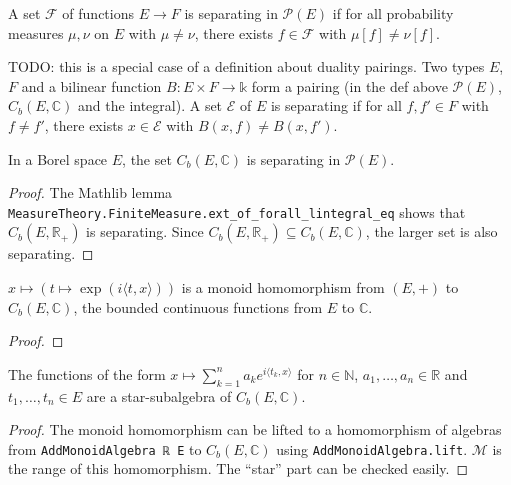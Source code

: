 \begin{definition}\label{def:separating}
A set $\mathcal F$ of functions $E \to F$ is separating in $\mathcal P(E)$ if for all probability measures $\mu, \nu$ on $E$ with $\mu \ne \nu$, there exists $f \in \mathcal F$ with $\mu[f] \ne \nu[f]$.
\end{definition}

TODO: this is a special case of a definition about duality pairings. Two types $E$, $F$ and a bilinear function $B : E \times F \to \mathbb{k}$ form a pairing (in the def above $\mathcal P(E)$, $C_b(E, \mathbb{C})$ and the integral). A set $\mathcal E$ of $E$ is separating if for all $f, f' \in F$ with $f \ne f'$, there exists $x \in \mathcal E$ with $B(x, f) \ne B(x, f')$. 

\begin{lemma}\label{lem:bounded_continuous_separating}
In a Borel space $E$, the set $C_b(E, \mathbb{C})$ is separating in $\mathcal P(E)$.
\end{lemma}

\begin{proof}
The Mathlib lemma \texttt{MeasureTheory.FiniteMeasure.ext\_of\_forall\_lintegral\_eq} shows that $C_b(E, \mathbb{R}_+)$ is separating. Since $C_b(E, \mathbb{R}_{+}) \subseteq C_b(E, \mathbb{C})$, the larger set is also separating.
\end{proof}

\begin{lemma}\label{lem:exp_character}
 \leanok
$x \mapsto (t \mapsto \exp(i \langle t, x \rangle))$ is a monoid homomorphism from $(E,+)$ to $C_b(E, \mathbb{C})$, the bounded continuous functions from $E$ to $\mathbb{C}$.
\end{lemma}

\begin{proof}\leanok
\end{proof}

\begin{lemma}\label{lem:starSubalgebra_expPoly}
 \leanok
The functions of the form $x \mapsto \sum_{k=1}^n a_k e^{i\langle t_k, x\rangle}$ for $n \in \mathbb{N}$, $a_1, \ldots, a_n \in \mathbb{R}$ and $t_1, \ldots, t_n \in E$ are a star-subalgebra of $C_b(E, \mathbb{C})$. 
\end{lemma}

\begin{proof} \leanok
The monoid homomorphism can be lifted to a homomorphism of algebras from \texttt{AddMonoidAlgebra ℝ E} to $C_b(E, \mathbb{C})$ using \texttt{AddMonoidAlgebra.lift}. $\mathcal M$ is the range of this homomorphism. The ``star'' part can be checked easily.
\end{proof}


